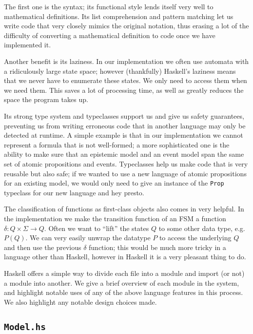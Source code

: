 \documentclass[12pt, a4paper]{article}
\begin{document}
The first one is the syntax; its functional style lends itself very well to
mathematical definitions. Its list comprehension and pattern matching let us
write code that very closely mimics the original notation, thus erasing a lot of
the difficulty of converting a mathematical definition to code once we have
implemented it. 

Another benefit is its laziness. In our implementation we often use automata
with a ridiculously large state space; however (thankfully) Haskell's laziness
means that we never have to enumerate these states. We only need to access them
when we need them. This saves a lot of processing time, as well as greatly
reduces the space the program takes up.

Its strong type system and typeclasses support us and give us safety guarantees,
preventing us from writing erroneous code that in another language may only be
detected at runtime. A simple example is that in our implementation we cannot
represent a formula that is not well-formed; a more sophisticated one is the
ability to make sure that an epistemic model and an event model span the same
set of atomic propositions and events. Typeclasses help us make code that is
very reusable but also safe; if we wanted to use a new language of atomic
propositions for an existing model, we would only need to give an instance of
the \texttt{Prop} typeclass for our new language and hey presto.

The classification of functions as first-class objects also comes in very
helpful. In the implementation we make the transition function of an FSM a
function $\delta : Q \times \Sigma \rightarrow Q$. Often we want to ``lift'' the
states $Q$ to some other data type, e.g. $P (Q)$. We can very easily unwrap the
datatype $P$ to access the underlying $Q$ and then use the previous $\delta$
function; this would be much more tricky in a language other than Haskell,
however in Haskell it is a very pleasant thing to do.

\bigskip

Haskell offers a simple way to divide each file into a module and import (or
not) a module into another. We give a brief overview of each module in the
system, and highlight notable uses of any of the above language features in this
process. We also highlight any notable design choices made. 

\subsection{\texttt{Model.hs}}
\end{document}
